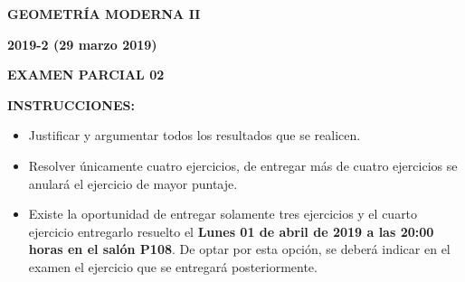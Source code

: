 \documentclass[10pt]{report}
\begin{document}
\begin{center}
\textbf{\LARGE {GEOMETRÍA MODERNA II}}
\end{center}

\begin{center}
\textbf{{\large 2019-2 (29 marzo 2019)}}
\end{center}

\begin{center}
\textbf{{\large EXAMEN PARCIAL 02}}
\end{center}

{\bf INSTRUCCIONES:}
\begin{itemize}
\item Justificar y argumentar todos los resultados que se realicen.
\item Resolver únicamente cuatro ejercicios, de entregar más de cuatro ejercicios se anulará el ejercicio de mayor puntaje.
\item Existe la oportunidad de entregar solamente tres ejercicios y el cuarto ejercicio entregarlo resuelto el \textbf{Lunes 01 de abril de 2019 a las 20:00 horas en el salón P108}. De optar por esta opción, se deberá indicar en el examen el ejercicio que se entregará posteriormente.

\end{itemize}
\end{document}
